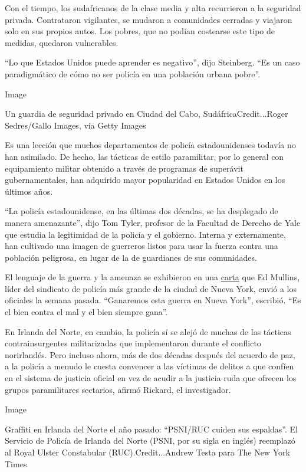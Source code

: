 Con el tiempo, los sudafricanos de la clase media y alta recurrieron a
la seguridad privada. Contrataron vigilantes, se mudaron a comunidades
cerradas y viajaron solo en sus propios autos. Los pobres, que no podían
costearse este tipo de medidas, quedaron vulnerables.

``Lo que Estados Unidos puede aprender es negativo'', dijo Steinberg.
``Es un caso paradigmático de cómo no ser policía en una población
urbana pobre''.

Image

Un guardia de seguridad privado en Ciudad del Cabo,
SudáfricaCredit...Roger Sedres/Gallo Images, vía Getty Images

Es una lección que muchos departamentos de policía estadounidenses
todavía no han asimilado. De hecho, las tácticas de estilo paramilitar,
por lo general con equipamiento militar obtenido a través de programas
de superávit gubernamentales, han adquirido mayor popularidad en Estados
Unidos en los últimos años.

``La policía estadounidense, en las últimas dos décadas, se ha
desplegado de manera amenazante'', dijo Tom Tyler, profesor de la
Facultad de Derecho de Yale que estudia la legitimidad de la policía y
el gobierno. Interna y externamente, han cultivado una imagen de
guerreros listos para usar la fuerza contra una población peligrosa, en
lugar de la de guardianes de sus comunidades.

El lenguaje de la guerra y la amenaza se exhibieron en una
\href{https://m.facebookcorewwwi.onion/story.php?story_fbid=3016295705125288\&id=111377202283834}{carta}
que Ed Mullins, líder del sindicato de policía más grande de la ciudad
de Nueva York, envió a los oficiales la semana pasada. ``Ganaremos esta
guerra en Nueva York'', escribió. ``Es el bien contra el mal y el bien
siempre gana''.

En Irlanda del Norte, en cambio, la policía sí se alejó de muchas de las
tácticas contrainsurgentes militarizadas que implementaron durante el
conflicto norirlandés. Pero incluso ahora, más de dos décadas después
del acuerdo de paz, a la policía a menudo le cuesta convencer a las
víctimas de delitos a que confíen en el sistema de justicia oficial en
vez de acudir a la justicia ruda que ofrecen los grupos paramilitares
sectarios, afirmó Rickard, el investigador.

Image

Graffiti en Irlanda del Norte el año pasado: ``PSNI/RUC cuiden sus
espaldas''. El Servicio de Policía de Irlanda del Norte (PSNI, por su
sigla en inglés) reemplazó al Royal Ulster Constabular
(RUC).Credit...Andrew Testa para The New York Times

